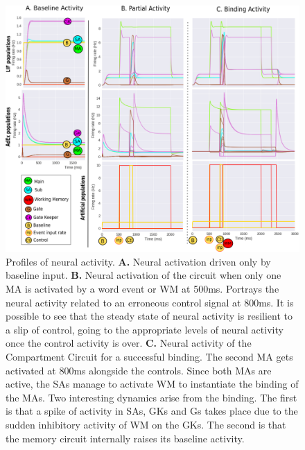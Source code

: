\documentclass[10pt]{article}
\begin{document}
\begin{figure}[h!]
  \begin{center}
    \includegraphics[width=\columnwidth]{figures/compartment_circuit_dynamics/compartment_circuit_dynamics}
    \caption{Profiles of neural activity.
      \textbf{A.} Neural activation driven only by baseline input. \textbf{B.} Neural activation of the circuit when only one MA is activated by a word event or WM at 500ms.
      Portrays the neural activity related to an erroneous control signal at 800ms.
      It is possible to see that the steady state of neural activity is resilient to a slip of control, going to the appropriate levels of neural activity once the control activity is over.
      \textbf{C.} Neural activity of the Compartment Circuit for a successful binding.
      The second MA gets activated at 800ms alongside the controls.
      Since both MAs are active, the SAs manage to activate WM to instantiate the binding of the MAs.
      Two interesting dynamics arise from the binding.
      The first is that a spike of activity in SAs, GKs and Gs takes place due to the sudden inhibitory activity of WM on the GKs.
      The second is that the memory circuit internally raises its baseline activity.%
    }

      \label{activity_profiles}
  \end{center}
\end{figure}
\end{document}
